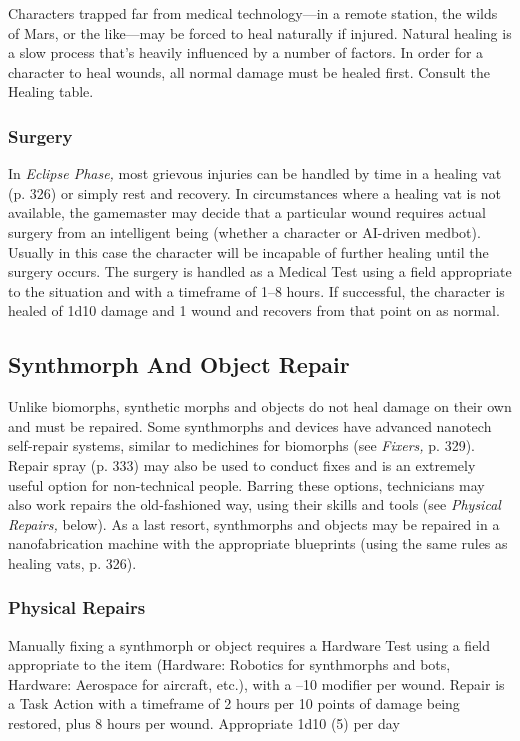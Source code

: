 Characters trapped far from medical technology—in 
a remote station, the wilds of Mars, or the like—may 
be forced to heal naturally if injured. Natural healing 
is a slow process that's heavily influenced by a number 
of factors. In order for a character to heal wounds, 
all normal damage must be healed first. Consult the 
Healing table.

\subsubsection{Surgery}

In \textit{Eclipse Phase,} most grievous injuries can be handled
by time in a healing vat (p. 326) or simply rest
and recovery. In circumstances where a healing vat is 
not available, the gamemaster may decide that a particular
wound requires actual surgery from an intelligent
being (whether a character or AI-driven medbot).
Usually in this case the character will be incapable of 
further healing until the surgery occurs. The surgery 
is handled as a Medical Test using a field appropriate 
to the situation and with a timeframe of 1–8 hours. If 
successful, the character is healed of 1d10 damage and 
1 wound and recovers from that point on as normal.

\subsection{Synthmorph And Object Repair}

Unlike biomorphs, synthetic morphs and objects do not 
heal damage on their own and must be repaired. Some 
synthmorphs and devices have advanced nanotech self-repair
systems, similar to medichines for biomorphs (see
\textit{Fixers,} p. 329). Repair spray (p. 333) may also be used 
to conduct fixes and is an extremely useful option for 
non-technical people. Barring these options, technicians 
may also work repairs the old-fashioned way, using 
their skills and tools (see \textit{Physical Repairs,} below). As a 
last resort, synthmorphs and objects may be repaired in 
a nanofabrication machine with the appropriate blueprints
(using the same rules as healing vats, p. 326).

\subsubsection{Physical Repairs}

Manually fixing a synthmorph or object requires a 
Hardware Test using a field appropriate to the item 
(Hardware: Robotics for synthmorphs and bots, 
Hardware: Aerospace for aircraft, etc.), with a –10 
modifier per wound. Repair is a Task Action with 
a timeframe of 2 hours per 10 points of damage 
being restored, plus 8 hours per wound. Appropriate 
1d10 (5) per day

